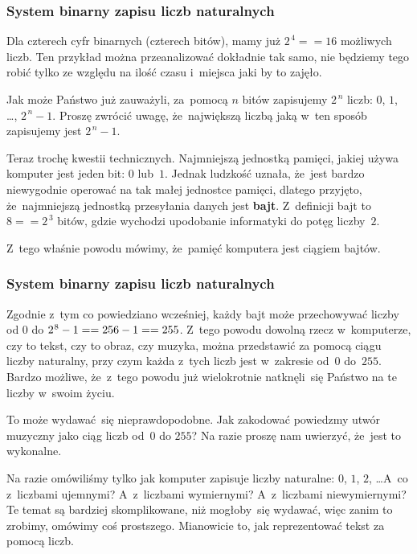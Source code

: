 \documentclass[10pt,t]{beamer}
\begin{document}
\begin{frame}
  \frametitle{System binarny zapisu liczb naturalnych}


  Dla czterech cyfr binarnych (czterech bitów), mamy już $2^{ \, 4 } == 16$
  możliwych liczb. Ten przykład można przeanalizować dokładnie tak samo,
  nie będziemy tego robić tylko ze względu na ilość czasu i~miejsca
  jaki by to zajęło.

  Jak może Państwo już zauważyli, za~pomocą $n$ bitów zapisujemy
  $2^{ \, n }$ liczb: $0$, $1$, \ldots, $2^{ \, n } - 1$. Proszę zwrócić uwagę,
  że~\alert{największą} liczbą jaką w~ten sposób zapisujemy jest
  $2^{ \, n } - 1$.

  Teraz trochę kwestii technicznych. Najmniejszą jednostką pamięci, jakiej
  używa komputer jest jeden bit: $0$ lub~$1$. Jednak ludzkość uznała,
  że~jest bardzo niewygodnie operować na tak małej jednostce pamięci,
  dlatego przyjęto, że~najmniejszą jednostką \alert{przesyłania} danych
  jest \textbf{bajt}. Z~definicji bajt to $8 == 2^{ \, 3 }$ bitów, gdzie
  wychodzi upodobanie informatyki do potęg liczby~$2$.

  Z~tego właśnie powodu mówimy, że~pamięć komputera jest ciągiem bajtów.

\end{frame}





\begin{frame}
  \frametitle{System binarny zapisu liczb naturalnych}


  Zgodnie z~tym co powiedziano wcześniej, każdy bajt może przechowywać
  liczby od $0$ do $2^{ \hspace{0.05em} 8 } - 1 == 256 - 1 == 255$. Z~tego
  powodu dowolną rzecz w~komputerze, czy to tekst, czy to obraz, czy
  muzyka, można przedstawić za pomocą ciągu liczby naturalny, przy czym
  każda z~tych liczb jest w~zakresie od~$0$ do~$255$. Bardzo możliwe,
  że~z~tego powodu już wielokrotnie natknęli~się Państwo na te liczby
  w~swoim życiu.

  To może wydawać~się nieprawdopodobne. Jak zakodować powiedzmy utwór
  muzyczny jako ciąg liczb od~$0$ do $255$? Na razie proszę nam uwierzyć,
  że~jest to wykonalne.

  Na razie omówiliśmy tylko jak komputer zapisuje liczby naturalne: $0$,
  $1$, $2$, \ldots A~co z~liczbami ujemnymi? A~z~liczbami wymiernymi?
  A~z~liczbami niewymiernymi? Te temat są bardziej skomplikowane, niż
  mogłoby~się wydawać, więc zanim to zrobimy, omówimy coś prostszego.
  Mianowicie to, jak reprezentować tekst za pomocą liczb.

\end{frame}
\end{document}
